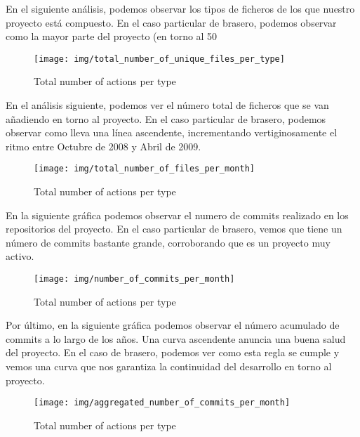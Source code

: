 \newpage
\thispagestyle{empty}
 En el siguiente an\'alisis, podemos observar los tipos de ficheros de los que nuestro proyecto est\'a compuesto. En el caso particular de brasero, podemos observar como la mayor parte del proyecto (en torno al 50%

\begin{figure}
  \centering
    \texttt{[image: img/total\_number\_of\_unique\_files\_per\_type]}
  \caption{Total number of actions per type}
\end{figure}

\newpage
\thispagestyle{empty}
 En el an\'alisis siguiente, podemos ver el n\'umero total de ficheros que se van añadiendo en torno al proyecto. En el caso particular de brasero, podemos observar como lleva una l\'inea ascendente, incrementando vertiginosamente el ritmo entre Octubre de 2008 y Abril de 2009.

\begin{figure}
  \centering
    \texttt{[image: img/total\_number\_of\_files\_per\_month]}
  \caption{Total number of actions per type}
\end{figure}

\newpage
\thispagestyle{empty}
 En la siguiente gr\'afica podemos observar el numero de commits realizado en los repositorios del proyecto. En el caso particular de brasero, vemos que tiene un n\'umero de commits bastante grande, corroborando que es un proyecto muy activo.

\begin{figure}
  \centering
    \texttt{[image: img/number\_of\_commits\_per\_month]}
  \caption{Total number of actions per type}
\end{figure}

\newpage
\thispagestyle{empty}
 Por \'ultimo, en la siguiente gr\'afica podemos observar el n\'umero acumulado de commits a lo largo de los años. Una curva ascendente anuncia una buena salud del proyecto. En el caso de brasero, podemos ver como esta regla se cumple y vemos una curva que nos garantiza la continuidad del desarrollo en torno al proyecto.

\begin{figure}
  \centering
    \texttt{[image: img/aggregated\_number\_of\_commits\_per\_month]}
  \caption{Total number of actions per type}
\end{figure}
